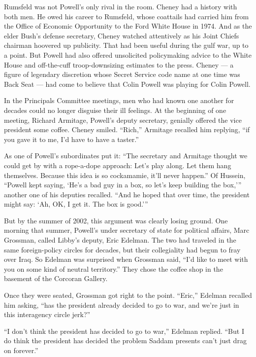 Rumsfeld was not Powell's only rival in the room. Cheney had a history
with both men. He owed his career to Rumsfeld, whose coattails had
carried him from the Office of Economic Opportunity to the Ford White
House in 1974. And as the elder Bush's defense secretary, Cheney watched
attentively as his Joint Chiefs chairman hoovered up publicity. That had
been useful during the gulf war, up to a point. But Powell had also
offered unsolicited policymaking advice to the White House and
off-the-cuff troop-downsizing estimates to the press. Cheney --- a
figure of legendary discretion whose Secret Service code name at one
time was Back Seat --- had come to believe that Colin Powell was playing
for Colin Powell.

In the Principals Committee meetings, men who had known one another for
decades could no longer disguise their ill feelings. At the beginning of
one meeting, Richard Armitage, Powell's deputy secretary, genially
offered the vice president some coffee. Cheney smiled. ``Rich,''
Armitage recalled him replying, ``if you gave it to me, I'd have to have
a taster.''

As one of Powell's subordinates put it: ``The secretary and Armitage
thought we could get by with a rope-a-dope approach: Let's play along.
Let them hang themselves. Because this idea is so cockamamie, it'll
never happen.'' Of Hussein, ``Powell kept saying, `He's a bad guy in a
box, so let's keep building the box,''' another one of his deputies
recalled. ``And he hoped that over time, the president might say: `Ah,
OK, I get it. The box is good.'''

But by the summer of 2002, this argument was clearly losing ground. One
morning that summer, Powell's under secretary of state for political
affairs, Marc Grossman, called Libby's deputy, Eric Edelman. The two had
traveled in the same foreign-policy circles for decades, but their
collegiality had begun to fray over Iraq. So Edelman was surprised when
Grossman said, ``I'd like to meet with you on some kind of neutral
territory.'' They chose the coffee shop in the basement of the Corcoran
Gallery.

Once they were seated, Grossman got right to the point. ``Eric,''
Edelman recalled him asking, ``has the president already decided to go
to war, and we're just in this interagency circle jerk?''

``I don't think the president has decided to go to war,'' Edelman
replied. ``But I do think the president has decided the problem Saddam
presents can't just drag on forever.''


